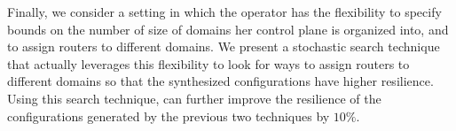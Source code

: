 Finally, we consider a setting in which the operator has the
flexibility to specify bounds on the number of size of domains her
control plane is organized into, and to assign routers to different
domains.  We present a stochastic search technique that actually
leverages this flexibility to look for ways to assign routers to
different domains so that the synthesized configurations have higher
resilience.  Using this search technique, \name can further improve
the resilience of the configurations generated by the previous two
techniques by $10\%$.







